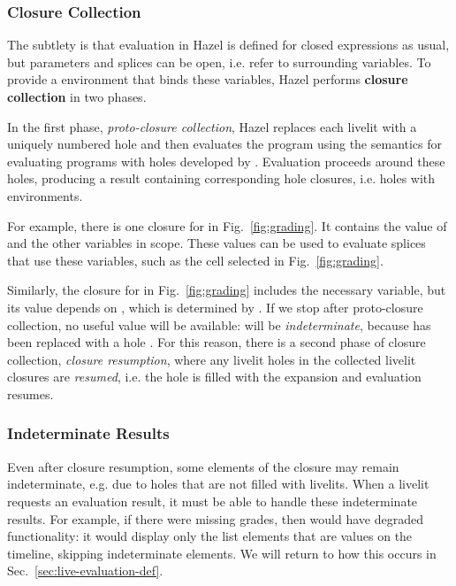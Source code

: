 \subsubsection{Closure Collection}\label{sec:closure-collection-example} The subtlety is that 
evaluation in Hazel is defined for closed expressions as usual,
but parameters and splices can be open, i.e. refer to surrounding variables.
To provide a environment that binds these variables,
Hazel performs \textbf{closure collection} in two phases.

In the first phase, \emph{proto-closure collection},
Hazel replaces each livelit with a uniquely numbered hole and then evaluates the program
using the semantics for evaluating programs with holes developed by \citet{HazelnutLive}.
Evaluation proceeds around these holes, producing a result containing
corresponding hole closures, i.e. holes with environments.

For example, there is one closure for  in Fig.~\ref{fig:grading}.
It contains the value of  and the other variables in scope.
These values can be used to evaluate
splices that use these variables, such as the cell selected in Fig.~\ref{fig:grading}.

Similarly, the closure for  in Fig.~\ref{fig:grading} includes
the necessary  variable, but
its value depends on , which is determined by .
If we stop after proto-closure collection,
no useful value will be available:
 will be \emph{indeterminate}, because  has been replaced with a hole \cite{HazelnutLive}.
For this reason, there is a second phase of closure collection, \emph{closure resumption},
where any livelit holes
in the collected livelit closures are \emph{resumed}, i.e. the hole is filled with the expansion
 and evaluation resumes.


\subsubsection{Indeterminate Results}
Even after closure resumption, some elements of the closure may remain indeterminate, e.g. due to holes that
are not filled with livelits.
When a livelit requests an evaluation result, it must be able to handle these indeterminate results.
For example, if there were missing grades,
then  would have degraded functionality:
it would display only the list elements that are values on the timeline, skipping indeterminate elements.
We will return to how this occurs in Sec.~\ref{sec:live-evaluation-def}.



